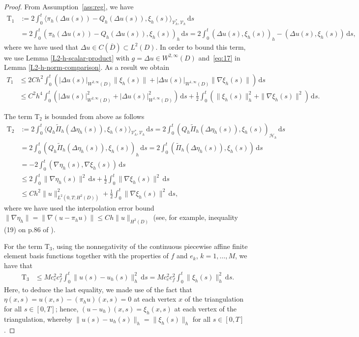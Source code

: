 \documentclass[12pt]{article}
\newcommand{\dd}{\,\mathrm{d}}
\begin{document}
{\begin{proof}
From Assumption~\ref{ass:reg}, we have 
%
\begin{align*}
    \mathrm{T}_1&:=  2 \int_0^t  \langle  {\pi}_h (\Delta u(s))  - {Q}_h (\Delta u(s)), \xi_h(s) \rangle_{\mathcal{V}_h^*,\mathcal{V}_h}\dd  s 
        \\
&= 2 \int_0^t  \left( {\pi}_h (\Delta u(s))  - {Q}_h  (\Delta u(s)), \xi_h(s) \right)_h\dd s = 2 \int_0^t  \left( \Delta u(s), \xi_h(s) \right)_h   - \left(   \Delta u(s), \xi_h(s) \right)\dd s,
\end{align*}
%
where we have used that $\Delta u \in C(\overline{D}) \subset L^2(D)$. In order to bound this term, we use Lemma \ref{L2-h-scalar-product} with $g=\Delta u \in W^{2,\infty}(D)$ and~\eqref{eq:17} in Lemma \ref{L2-h-norm-comparison}. As a result we obtain 
\begin{align}
    T_1 &\leq 2 C h^2 \int_0^t\left(|\Delta u(s)|_{W^{2,\infty}(D)}\|\xi_h(s)\| + |\Delta u(s)|_{W^{1,\infty}(D)}\|\nabla \xi_h(s)\| \right)\dd s \nonumber\\
    &\leq C^2 h^4 \int_0^t \left(|\Delta u(s)|_{W^{2,\infty}(D)}^2 +|\Delta u(s)|_{W^{1,\infty}(D)}^2 \right)\dd s +  \frac{1}{2}\int_0^t \left(\|\xi_h(s)\|^2_h +\| \nabla \xi_h(s)\|^2 \right) \! \dd s.
\end{align}

The term $\mathrm{T}_2$ is bounded from above as follows
%
\begin{align*}
    \mathrm{T}_2&:= 2 \int_0^t \langle Q_h \tilde{\Pi}_h(\Delta \eta_h(s)),\xi_h(s)\rangle_{\mathcal{V}_h^*, \mathcal{V}_h} \dd s =  2 \int_0^t \left( Q_h \tilde{\Pi}_h(\Delta \eta_h(s)),\xi_h(s)\right)_{\mathcal{H}_h}  \dd s\\
    & =  2 \int_0^t \left( Q_h \tilde{\Pi}_h(\Delta \eta_h(s)),\xi_h(s)\right)_h  \dd s =  2 \int_0^t \left(\tilde{\Pi}_h(\Delta \eta_h(s)),\xi_h(s)\right)  \dd s\\
    &= -2 \int_0^t (\nabla \eta_h(s), \nabla \xi_h(s)) \dd s\\
    & \leq 2\int_0^t \|\nabla \eta_h(s)\|^2 \dd s + \frac{1}{2}\int_0^t \|\nabla \xi_h(s)\|^2 \dd s\\
    &\leq  Ch^2 \|u\|^2_{L^2(0,T;H^2(D))} + \frac{1}{2}\int_0^t \|\nabla \xi_h(s)\|^2 \dd s,
\end{align*}
%
where we have used the interpolation error bound $\|\nabla \eta_h\| = \|\nabla(u - \pi_h u)\| \leq C h \|u\|_{H^2(D)}$ (see, for example, inequality (19) on p.86 of  \cite{MR584442}).

For the term $\mathrm{T}_3$, using the nonnegativity of the continuous piecewise affine finite element basis functions together with the properties of $f$ and $e_k$, $k=1,\ldots,M$, we have that 
%
\begin{align*}
    \mathrm{T}_3& \leq M c_e^2 c_f^2 \int_0^t \|u(s) - u_h(s)\|^2_h \dd s = M c_e^2 c_f^2 \int_0^t \|\xi_h(s)\|^2_h \dd s.
\end{align*}
%
Here, to deduce the last equality, we made use of the fact that $\eta(x,s)=u(x,s) - (\pi_hu)(x,s) = 0$ at each vertex $x$ of the triangulation for all $s \in [0,T]$; hence, 
$(u-u_h)(x,s) = \xi_h(x,s)$ at each vertex of the triangulation, whereby $\|u(s)-u_h(s)\|_h = \|\xi_h(s)\|_h$ for all $s \in [0,T]$. 



\end{proof}}
\end{document}
